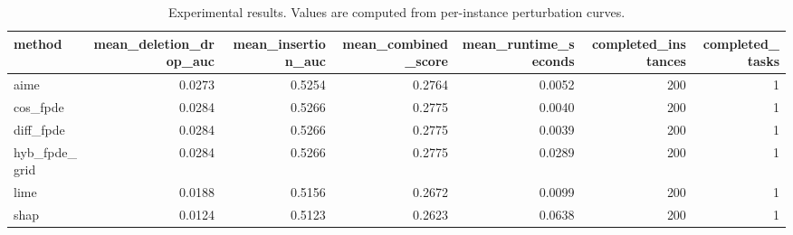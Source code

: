 \begin{table}[t]
\caption{Experimental results. Values are computed from per-instance perturbation curves.}
\label{tab:main_results_computed}
\centering
\begin{tabular}{lrrrrrr}
\toprule
method & mean\_deletion\_drop\_auc & mean\_insertion\_auc & mean\_combined\_score & mean\_runtime\_seconds & completed\_instances & completed\_tasks \\
\midrule
aime & 0.0273 & 0.5254 & 0.2764 & 0.0052 & 200 & 1 \\
cos\_fpde & 0.0284 & 0.5266 & 0.2775 & 0.0040 & 200 & 1 \\
diff\_fpde & 0.0284 & 0.5266 & 0.2775 & 0.0039 & 200 & 1 \\
hyb\_fpde\_grid & 0.0284 & 0.5266 & 0.2775 & 0.0289 & 200 & 1 \\
lime & 0.0188 & 0.5156 & 0.2672 & 0.0099 & 200 & 1 \\
shap & 0.0124 & 0.5123 & 0.2623 & 0.0638 & 200 & 1 \\
\bottomrule
\end{tabular}

\end{table}
